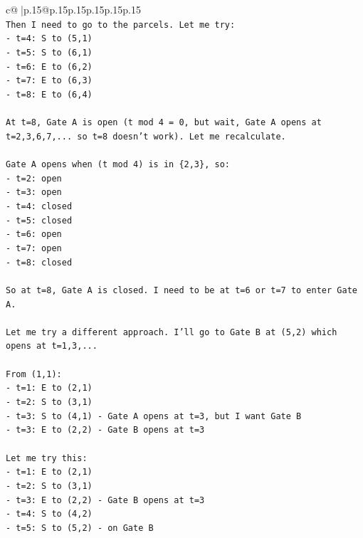 \documentclass{article}
\begin{document}
{\begin{supertabular}{c@{$\;$}|p{.15\linewidth}@{}p{.15\linewidth}p{.15\linewidth}p{.15\linewidth}p{.15\linewidth}p{.15\linewidth}}
{{{\\ 
\texttt{Then I need to go to the parcels. Let me try:} \\
\texttt{{-} t=4: S to (5,1)} \\
\texttt{{-} t=5: S to (6,1)} \\
\texttt{{-} t=6: E to (6,2)} \\
\texttt{{-} t=7: E to (6,3)} \\
\texttt{{-} t=8: E to (6,4)} \\
\\ 
\texttt{At t=8, Gate A is open (t mod 4 = 0, but wait, Gate A opens at t=2,3,6,7,... so t=8 doesn't work). Let me recalculate.} \\
\\ 
\texttt{Gate A opens when (t mod 4) is in \{2,3\}, so:} \\
\texttt{{-} t=2: open} \\
\texttt{{-} t=3: open} \\
\texttt{{-} t=4: closed} \\
\texttt{{-} t=5: closed} \\
\texttt{{-} t=6: open} \\
\texttt{{-} t=7: open} \\
\texttt{{-} t=8: closed} \\
\\ 
\texttt{So at t=8, Gate A is closed. I need to be at t=6 or t=7 to enter Gate A.} \\
\\ 
\texttt{Let me try a different approach. I'll go to Gate B at (5,2) which opens at t=1,3,...} \\
\\ 
\texttt{From (1,1):} \\
\texttt{{-} t=1: E to (2,1)} \\
\texttt{{-} t=2: S to (3,1)} \\
\texttt{{-} t=3: S to (4,1) {-} Gate A opens at t=3, but I want Gate B} \\
\texttt{{-} t=3: E to (2,2) {-} Gate B opens at t=3} \\
\\ 
\texttt{Let me try this:} \\
\texttt{{-} t=1: E to (2,1)} \\
\texttt{{-} t=2: S to (3,1)} \\
\texttt{{-} t=3: E to (2,2) {-} Gate B opens at t=3} \\
\texttt{{-} t=4: S to (4,2)} \\
\texttt{{-} t=5: S to (5,2) {-} on Gate B} \\
}}}
\end{supertabular}}
\end{document}
